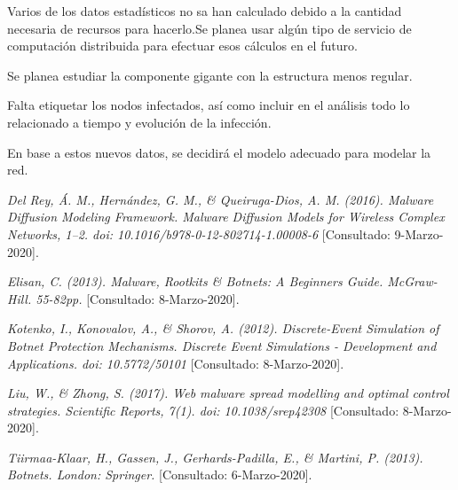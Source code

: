 \documentclass[12pt]{extreport}
\begin{document}
	 Varios de los datos estadísticos no sa han calculado debido a la cantidad 
	necesaria de recursos para hacerlo.Se planea usar algún tipo de servicio 
	de computación distribuida para efectuar esos cálculos en el futuro.
	
	Se planea estudiar la componente gigante con  la estructura menos regular.
	
	Falta etiquetar los nodos infectados, así como incluir en el análisis todo lo 
	relacionado a tiempo y evolución de la infección.
	
	En base a estos nuevos datos, se decidirá el modelo adecuado para modelar la red.
	\begin{thebibliography}{1}	
		\textit{Del Rey, Á. M., Hernández, G. M., \& Queiruga-Dios, A. M. (2016). Malware Diffusion Modeling Framework. Malware Diffusion Models for Wireless Complex Networks, 1–2. doi: 10.1016/b978-0-12-802714-1.00008-6}
		[Consultado: 9-Marzo-2020].
		
		\textit{Elisan, C. (2013). Malware, Rootkits \& Botnets: A Beginners Guide. McGraw-Hill. 55-82pp.}
		[Consultado: 8-Marzo-2020].
		
		\textit{Kotenko, I., Konovalov, A., \& Shorov, A. (2012). Discrete-Event Simulation of Botnet Protection Mechanisms. Discrete Event Simulations - Development and Applications. doi: 10.5772/50101}
		[Consultado: 8-Marzo-2020].
		
		\textit{Liu, W., \& Zhong, S. (2017). Web malware spread modelling and optimal control strategies. Scientific Reports, 7(1). doi: 10.1038/srep42308}
		[Consultado: 8-Marzo-2020].
		
		\textit{Tiirmaa-Klaar, H., Gassen, J., Gerhards-Padilla, E., \& Martini, P. (2013). Botnets. London: Springer.}
		[Consultado: 6-Marzo-2020].
	
		
		
		
	\end{thebibliography}
\end{document}
